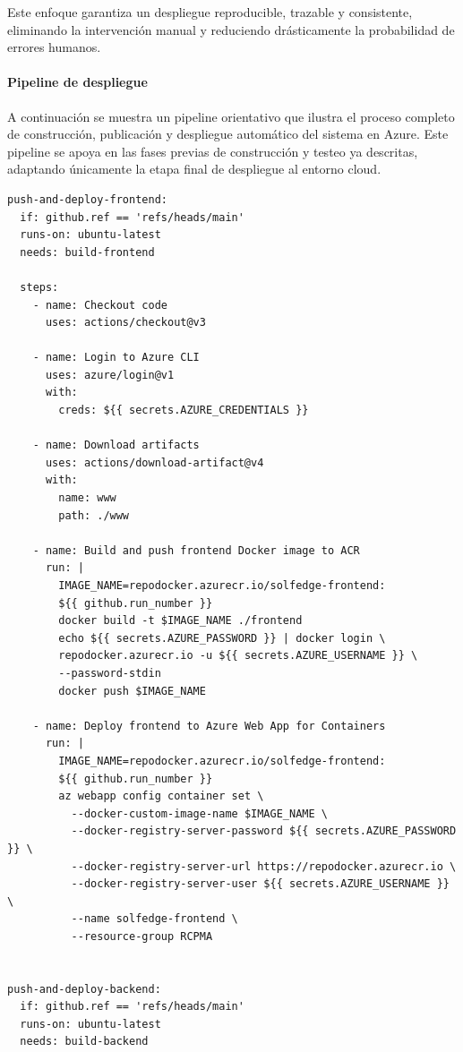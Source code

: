Este enfoque garantiza un despliegue reproducible, trazable y consistente, eliminando la intervención manual y reduciendo drásticamente la probabilidad de errores humanos.

\paragraph{Pipeline de despliegue}

A continuación se muestra un pipeline orientativo que ilustra el proceso completo de construcción, publicación y despliegue automático del sistema en Azure. Este pipeline se apoya en las fases previas de construcción y testeo ya descritas, adaptando únicamente la etapa final de despliegue al entorno cloud.
\newpage
\begin{Verbatim}[frame=single, fontsize=\small]
push-and-deploy-frontend:
  if: github.ref == 'refs/heads/main'
  runs-on: ubuntu-latest
  needs: build-frontend

  steps:
    - name: Checkout code
      uses: actions/checkout@v3

    - name: Login to Azure CLI
      uses: azure/login@v1
      with:
        creds: ${{ secrets.AZURE_CREDENTIALS }}

    - name: Download artifacts
      uses: actions/download-artifact@v4
      with: 
        name: www
        path: ./www

    - name: Build and push frontend Docker image to ACR
      run: |
        IMAGE_NAME=repodocker.azurecr.io/solfedge-frontend:
        ${{ github.run_number }}
        docker build -t $IMAGE_NAME ./frontend
        echo ${{ secrets.AZURE_PASSWORD }} | docker login \
        repodocker.azurecr.io -u ${{ secrets.AZURE_USERNAME }} \
        --password-stdin
        docker push $IMAGE_NAME

    - name: Deploy frontend to Azure Web App for Containers
      run: |
        IMAGE_NAME=repodocker.azurecr.io/solfedge-frontend:
        ${{ github.run_number }}
        az webapp config container set \
          --docker-custom-image-name $IMAGE_NAME \
          --docker-registry-server-password ${{ secrets.AZURE_PASSWORD }} \
          --docker-registry-server-url https://repodocker.azurecr.io \
          --docker-registry-server-user ${{ secrets.AZURE_USERNAME }} \
          --name solfedge-frontend \
          --resource-group RCPMA


push-and-deploy-backend:
  if: github.ref == 'refs/heads/main'
  runs-on: ubuntu-latest
  needs: build-backend


\end{Verbatim}
